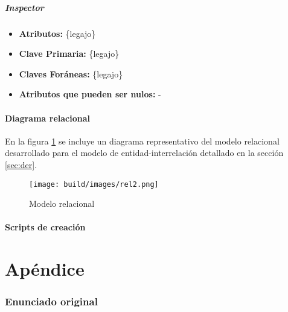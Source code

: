 \documentclass[a4paper,11pt]{article}
\begin{document}
\subsubsection{Inspector}

\begin{itemize}

	\item \textbf{Atributos:} \{legajo\}
	
	\item \textbf{Clave Primaria:} \{legajo\}
	
	\item \textbf{Claves Foráneas:} \{legajo\}
	
	\item \textbf{Atributos que pueden ser nulos:} -
	
\end{itemize}

\subsection{Diagrama relacional}

 En la figura \ref{fig:relacional} se incluye un diagrama representativo del
 modelo relacional desarrollado para el modelo de entidad-interrelación
 detallado en la sección \ref{sec:der}.

\begin{figure}[h!t]
	\centering
	\texttt{[image: build/images/rel2.png]}
	\caption{Modelo relacional} \label{fig:relacional}
\end{figure}

\FloatBarrier

\subsection{Scripts de creación}




\clearpage

\part{Apéndice}
\appendix

\section{Enunciado original}\label{sec:enunciado}

\end{document}
